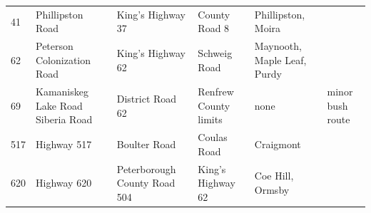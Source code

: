 \documentclass{article}
\begin{document}
\begin{tabular}{llllll}
41 & Phillipston Road & King's Highway 37 & County Road 8 & Phillipston, Moira &  \\
62 & Peterson Colonization Road & King's Highway 62 & Schweig Road & Maynooth, Maple Leaf, Purdy &  \\
69 & Kamaniskeg Lake Road Siberia Road & District Road 62 & Renfrew County limits & none & minor bush route \\
517 & Highway 517 & Boulter Road & Coulas Road & Craigmont &  \\
620 & Highway 620 & Peterborough County Road 504 & King's Highway 62 & Coe Hill, Ormsby &  \\
\bottomrule
\end{tabular}
\end{document}
